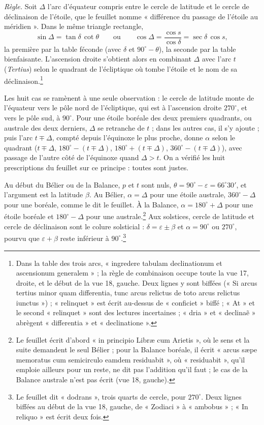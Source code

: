 \documentclass[11pt,a4paper]{article}
\begin{document}
\emph{Règle.} Soit $\Delta$ l'arc d'équateur compris entre le cercle de latitude
et le cercle de déclinaison de l'étoile, que le feuillet nomme « différence du
passage de l'étoile au méridien ». Dans le même triangle rectangle,
\[
\sin\Delta = \tan\delta\,\cot\theta \qquad\text{ou}\qquad
\cos\Delta = \frac{\cos s}{\cos\delta} = \sec\delta\,\cos s ,
\]
la première par la table féconde (avec $\delta$ et $90^\circ-\theta$), la seconde
par la table bienfaisante. L'ascension droite s'obtient alors en combinant $\Delta$
avec l'arc $t$ (\emph{Tertius}) selon le quadrant de l'écliptique où tombe
l'étoile et le nom de sa déclinaison.\footnote{Dans la table des trois arcs,
« ingredere tabulam declinationum et ascensionum generalem » ; la règle de
combinaison occupe toute la vue 17, droite, et le début de la vue 18, gauche. Deux
lignes y sont biffées (« Si arcus tertius minor quam differentia, tunc arcus
relictus de toto arcus relictus iunctus ») ; « relinquet » est écrit au-dessus de
« conficiet » biffé ; « At » et le second « relinquet » sont des lectures
incertaines ; « dria » et « declinaẽ » abrègent « differentia » et
« declinatione ».}

Les huit cas se ramènent à une seule observation : le cercle de latitude monte
de l'équateur vers le pôle nord de l'écliptique, qui est à l'ascension droite
$270^\circ$, et vers le pôle sud, à $90^\circ$. Pour une étoile boréale des deux
premiers quadrants, ou australe des deux derniers, $\Delta$ se retranche de $t$ ;
dans les autres cas, il s'y ajoute ; puis l'arc $t \mp \Delta$, compté depuis
l'équinoxe le plus proche, donne $\alpha$ selon le quadrant ($t\mp\Delta$,
$180^\circ - (t\mp\Delta)$, $180^\circ + (t\mp\Delta)$, $360^\circ - (t\mp\Delta)$),
avec passage de l'autre côté de l'équinoxe quand $\Delta > t$. On a vérifié les
huit prescriptions du feuillet sur ce principe : toutes sont
justes.

Au début du Bélier ou de la Balance, $p$ et $t$ sont nuls, $\theta =
90^\circ - \varepsilon = 66^\circ 30'$, et l'argument est la latitude $\beta$. Au
Bélier, $\alpha = \Delta$ pour une étoile australe, $360^\circ - \Delta$ pour une
boréale, comme le dit le feuillet. À la Balance, $\alpha = 180^\circ + \Delta$ pour
une étoile boréale et $180^\circ - \Delta$ pour une australe.\footnote{Le
feuillet écrit d'abord « in principio Libræ cum Arietis », où le sens et la suite
demandent le seul Bélier ; pour la Balance boréale, il écrit « arcus sæpe
memoratus cum semicirculo eamdem residuabit », où « residuabit », qu'il emploie
ailleurs pour un reste, ne dit pas l'addition qu'il faut ; le cas de la Balance
australe n'est pas écrit (vue 18, gauche).} Aux solstices, cercle de latitude et
cercle de déclinaison sont le colure solsticial : $\delta = \varepsilon \pm \beta$
et $\alpha = 90^\circ$ ou $270^\circ$, pourvu que $\varepsilon + \beta$ reste
inférieur à $90^\circ$.\footnote{Le feuillet dit « dodrans », trois quarts de
cercle, pour $270^\circ$. Deux lignes biffées au début de la vue 18, gauche, de
« Zodiaci » à « ambobus » ; « In reliquo » est écrit deux fois.}
\end{document}
